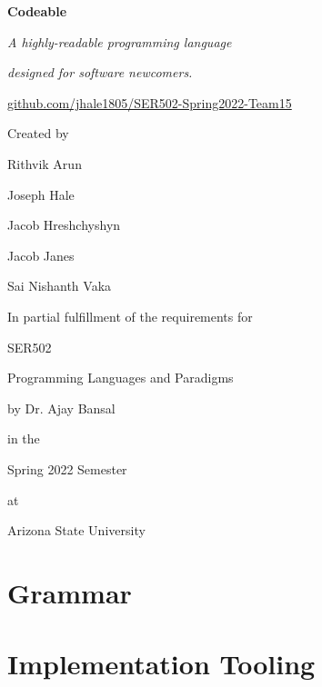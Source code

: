 \documentclass{article}
\begin{document}
    {
        \centering
        
        \textbf{\Huge{Codeable}}
        
        \vspace*{1em}
        \Large{\emph{A highly-readable programming language}}
        
        \Large{\emph{designed for software newcomers.}}
        
        \vspace*{1em}
        \href{https://github.com/jhale1805/SER502-Spring2022-Team15}{github.com/jhale1805/SER502-Spring2022-Team15}

        \vspace*{5em}
        \Large{Created by}
        
        \vspace*{1em}
        \normalsize{Rithvik Arun}
        
        Joseph Hale 
        
        Jacob Hreshchyshyn 
        
        Jacob Janes 
        
        Sai Nishanth Vaka
        
        \vspace*{5em}
        \Large{In partial fulfillment of the requirements for}
        
        \vspace*{1em}
        \normalsize{SER502}
        
        Programming Languages and Paradigms
        
        by Dr. Ajay Bansal
        
        \vspace*{1em}
        in the 
        
        Spring 2022 Semester
        
        \vspace*{1em}
        at

        Arizona State University

    }
    
    \newpage
    \section{Grammar}
    
    
    \newpage
    \section{Implementation Tooling}
    
\end{document}
